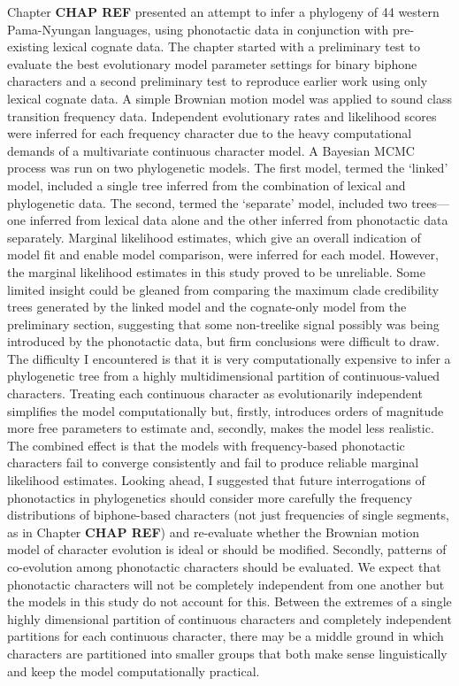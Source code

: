 Chapter \textbf{CHAP REF} presented an attempt to infer a phylogeny of 44 western Pama-Nyungan languages, using phonotactic data in conjunction with pre-existing lexical cognate data. The chapter started with a preliminary test to evaluate the best evolutionary model parameter settings for binary biphone characters and a second preliminary test to reproduce earlier work \autocite{bouckaert_origin_2018} using only lexical cognate data. A simple Brownian motion model was applied to sound class transition frequency data. Independent evolutionary rates and likelihood scores were inferred for each frequency character due to the heavy computational demands of a multivariate continuous character model. A Bayesian MCMC process was run on two phylogenetic models. The first model, termed the `linked' model, included a single tree inferred from the combination of lexical and phylogenetic data. The second, termed the `separate' model, included two trees---one inferred from lexical data alone and the other inferred from phonotactic data separately. Marginal likelihood estimates, which give an overall indication of model fit and enable model comparison, were inferred for each model. However, the marginal likelihood estimates in this study proved to be unreliable. Some limited insight could be gleaned from comparing the maximum clade credibility trees generated by the linked model and the cognate-only model from the preliminary section, suggesting that some non-treelike signal possibly was being introduced by the phonotactic data, but firm conclusions were difficult to draw. The difficulty I encountered is that it is very computationally expensive to infer a phylogenetic tree from a highly multidimensional partition of continuous-valued characters. Treating each continuous character as evolutionarily independent simplifies the model computationally but, firstly, introduces orders of magnitude more free parameters to estimate and, secondly, makes the model less realistic. The combined effect is that the models with frequency-based phonotactic characters fail to converge consistently and fail to produce reliable marginal likelihood estimates. Looking ahead, I suggested that future interrogations of phonotactics in phylogenetics should consider more carefully the frequency distributions of biphone-based characters (not just frequencies of single segments, as in Chapter \textbf{CHAP REF}) and re-evaluate whether the Brownian motion model of character evolution is ideal or should be modified. Secondly, patterns of co-evolution among phonotactic characters should be evaluated. We expect that phonotactic characters will not be completely independent from one another but the models in this study do not account for this. Between the extremes of a single highly dimensional partition of continuous characters and completely independent partitions for each continuous character, there may be a middle ground in which characters are partitioned into smaller groups that both make sense linguistically and keep the model computationally practical.

